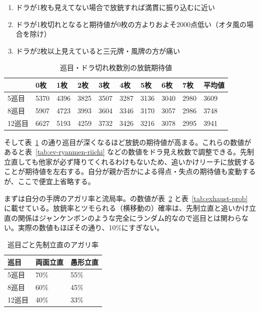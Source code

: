 \documentclass[10pt, twocolumn, notitlepage]{report}
\begin{document}
\begin{enumerate}
\item ドラが1枚も見えてない場合で放銃すれば満貫に振り込むに近い
\item ドラが1枚切れとなると期待値が0枚の方よりおよそ2000点低い（オタ風の場合を除け）
\item ドラが2枚以上見えていると三元牌・風牌の方が痛い
\end{enumerate}

\begin{table}[t]
  \centering
  \begin{tabular}{l|llllllll|l}
          & 0枚 & 1枚 & 2枚 & 3枚 & 4枚 & 5枚 & 6枚 & 7枚 & 平均値 \\
    \hline
    5巡目 & 5370 & 4396 & 3825 & 3507 & 3287 & 3136 & 3040 & 2980 & 3609 \\
    8巡目 & 5907 & 4723 & 3993 & 3604 & 3346 & 3170 & 3057 & 2986 & 3748 \\
    12巡目 & 6627 & 5193 & 4259 & 3732 & 3426 & 3216 & 3078 & 2995 & 3941 \\
  \end{tabular}
  \caption{巡目・ドラ切れ枚数別の放銃期待値\citep{ktrpry}}
  \label{tab:ev-dora-turn}
\end{table}

そして表~\ref{tab:ev-dora-turn} の通り巡目が深くなるほど放銃の期待値が高まる。これらの数値があると表~\ref{tab:ev-ryanmen-riichi} などの数値をドラ見え枚数で調整できる。先制立直しても他家が必ず降りてくれるわけもないため、追いかけリーチに放銃することが期待値を左右する。自分が親か否かによる得点・失点の期待値も変動するが、ここで便宜上省略する。

まずは自分の手牌のアガリ率と流局率。\citet{sinkagaku}の数値が表~\ref{tab:agari-prob} と表~\ref{tab:exhaust-prob} に載せている。放銃率とツモられる（横移動の）確率は、先制立直と追いかけ立直の関係はジャンケンボンのような完全にランダム的なので巡目とは関わらない。実際\citet{sinkagaku}の数値もほぼその通り、10\%にすぎない。

\begin{table}
  \centering
  \begin{tabular}{lll}
    巡目 & 両面立直 & 愚形立直 \\
    \hline
    5巡目 & 70\% & 55\% \\
    8巡目 & 60\% & 45\% \\
    12巡目 & 40\% & 33\% \\
  \end{tabular}
  \caption{巡目ごと先制立直のアガリ率}
  \label{tab:agari-prob}
\end{table}
\end{document}

